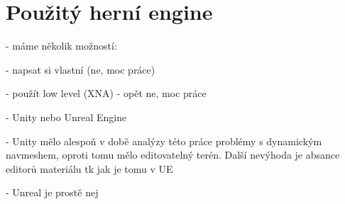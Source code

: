 
\section{Použitý herní engine}
- máme několik možností:

- napsat si vlastní (ne, moc práce)

- použít low level (XNA) - opět ne, moc práce

- Unity nebo Unreal Engine

- Unity mělo alespoň v době analýzy této práce problémy s dynamickým navmeshem, oproti tomu mělo editovatelný terén. Další nevýhoda je absance editorů materiálu tk jak je tomu v UE

- Unreal je prostě nej